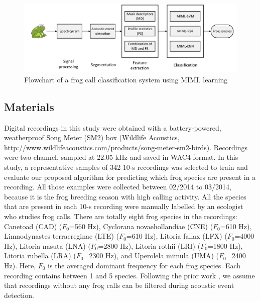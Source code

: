 \begin{figure}[htb!]
\centering
\includegraphics[width=\textwidth]{image/Ch6/flowchart.pdf}
\caption{Flowchart of a frog call classification system using MIML learning}
\label{fig:flowchart}
\end{figure}



\subsection{Materials}
\label{chap5:Materials}
Digital recordings in this study were obtained with a battery-powered, weatherproof Song
Meter (SM2) box (Wildlife Acoustics, http://www.wildlifeacoustics.com/products/song-meter-sm2-birds). Recordings were two-channel, sampled at 22.05 kHz and saved in WAC4 format. In this study, a representative samples of 342 10-s recordings was selected to train and evaluate our proposed algorithm for predicting which frog species are present in a recording. All those examples were collected between 02/2014 to 03/2014, because it is the frog breeding season with high calling activity. All the species that are present in each 10-s recording were manually labelled by an ecologist who studies frog calls.
There are totally eight frog species in the recordings: Canetoad (CAD) 
($F_{0}$=560 Hz), Cyclorana novaehollandiae (CNE) ($F_{0}$=610 Hz), Limnodynastes terraereginae (LTE) ($F_{0}$=610 Hz), Litoria fallax (LFX) ($F_{0}$=4000 Hz), Litoria nasuta (LNA) ($F_{0}$=2800 Hz), Litoria rothii (LRI) ($F_{0}$=1800 Hz), Litoria rubella (LRA) ($F_{0}$=2300 Hz), and Uperolela mimula (UMA) ($F_{0}$=2400 Hz). Here, $F_{0}$ is the averaged dominant frequency for each frog species. Each recording contains between 1 and 5 species. Following the prior work \cite{briggs2012acoustic}, we assume that recordings without any frog calls can be filtered during acoustic event detection.


